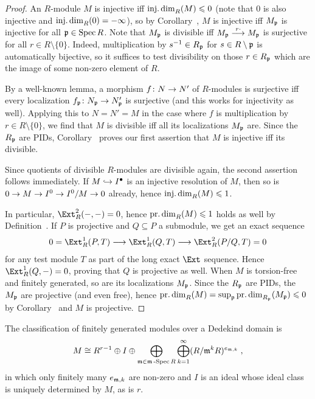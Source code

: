 \documentclass[a4paper,parskip=half,numbers=enddot, DIV=12]{scrreprt}
\renewcommand{\leq}{\leqslant}
\begin{document}
\begin{proof}
	An $R$-module $M$ is injective iff $\idim_R(M)\leq 0$ (note that $0$ is also injective and $\operatorname{inj.dim}_R(0)=-\infty$), so by Corollary~, $M$ is injective iff $M_{\mathfrak{p}}$ is injective for all $\mathfrak{p}\in \operatorname{Spec} R$. Note that $M_{\mathfrak{p}}$ is divisible iff $M_\pp\morphism[r\cdot]M_\pp$ is surjective for all $r\in R\setminus\{0\}$. Indeed, multiplication by $s^{-1}\in R_{\mathfrak{p}}$ for $s\in R\setminus \mathfrak{p}$ is automatically bijective, so it suffices to test divisibility on those $r\in R_{\mathfrak{p}}$ which are the image of some non-zero element of $R$.
	
	By a well-known lemma, a morphism $f\colon N\morphism N'$ of $R$-modules is surjective iff every localization $f_\pp\colon N_\pp\morphism N'_\pp$ is surjective (and this works for injectivity as well). Applying this to $N=N'=M$ in the case where $f$ is multiplication by $r\in R\setminus\{0\}$, we find that $M$ is divisible iff all its localizations $M_{\mathfrak{p}}$ are. Since the $R_{\mathfrak{p}}$ are PIDs, Corollary~ proves our first assertion that $M$ is injective iff its divisible.
	
	Since quotients of divisible $R$-modules are divisible again, the second assertion follows immediately. If $M\monomorphism I^\bullet$ is an injective resolution of $M$, then so is $0\morphism M\morphism I^0\morphism I^0/M\morphism 0$ already, hence $\idim_R(M)\leq 1$.
	
	In particular, $\Ext_R^2(-,-)=0$, hence $\pdim_R(M)\leq 1$ holds as well by Definition~. If $P$ is projective and $Q\subseteq P$ a submodule, we get an exact sequence 
	\begin{align*}
		0=\Ext_R^1(P,T)\morphism\Ext_R^1(Q,T)\morphism\Ext_R^2(P/Q,T)=0
	\end{align*}
	for any test module $T$ as part of the long exact $\Ext$ sequence. Hence $\Ext_R^1(Q,-)=0$, proving that $Q$ is projective as well. When $M$ is torsion-free and finitely generated, so are its localizations $M_{\mathfrak{p}}$. Since the $R_{\mathfrak{p}}$ are PIDs, the $M_{\mathfrak{p}}$ are projective (and even free), hence $\pdim_R(M)=\sup_\pp\pdim_{R_\pp}(M_\pp)\leq 0$ by Corollary~ and $M$ is projective.
\end{proof}
\begin{rem*}
	The classification of finitely generated modules over a Dedekind domain is
	\begin{align*}
		M\cong R^{r-1}\oplus I\oplus \bigoplus_{\mathfrak{m}\in\mathfrak{m}\operatorname{-Spec} R}\bigoplus_{k=1}^\infty (R/\mathfrak{m}^kR)^{e_{\mathfrak{m},k}}\;,
	\end{align*}
	in which only finitely many $e_{\mathfrak{m},k}$ are non-zero and $I$ is an ideal whose ideal class is uniquely determined by $M$, as is $r$.
\end{rem*}
	
\end{document}
